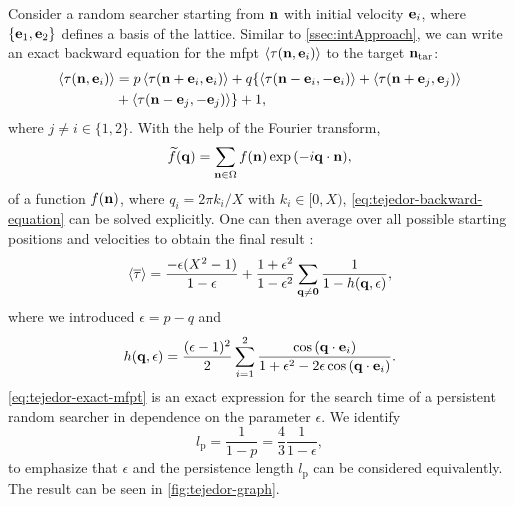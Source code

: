 Consider a random searcher starting from $\bv{n}$ with initial velocity $\bv{e}_i$, where $\{\bv{e}_1, \bv{e}_2\}$ defines a basis of the lattice. Similar to \autoref{ssec:intApproach}, we can write an exact backward equation for the \ac{mfpt} $\mfpt[\tau(\bv{n},\bv{e}_i)]$ to the target $\bv{n}_\textrm{tar}$:
\begin{equation}\label{eq:tejedor-backward-equation}
 \begin{aligned}
  \mfpt[\tau(\bv{n},\bv{e}_i)] &= p \mfpt[\tau(\bv{n} + \bv{e}_i,\bv{e}_i)] + q \{ \mfpt[\tau(\bv{n} - \bv{e}_i,-\bv{e}_i)] + \mfpt[\tau(\bv{n} + \bv{e}_j,\bv{e}_j)] 
  \\
  &+ \mfpt[\tau(\bv{n} - \bv{e}_j,-\bv{e}_j)] \} + 1,
 \end{aligned}
\end{equation}
where $j \neq i \in \{1,2\}$. With the help of the Fourier transform,
\begin{equation*}
 \fourier{f}(\bv{q}) = \sum\limits_{\bv{n} \in \Omega} f(\bv{n}) \exp{(-i \bv{q} \cdot \bv{n})},
\end{equation*}
of a function $f(\bv{n})$, where $q_i = 2\pi k_i / X$ with $k_i \in [0, X)$, \autoref{eq:tejedor-backward-equation} can be solved explicitly. One can then average over all possible starting positions and velocities to obtain the final result \cite{tejedor:2012}:
\begin{equation}\label{eq:tejedor-exact-mfpt}
 \mfpt[\mean{\tau}] = \frac{-\epsilon(X^2 - 1)}{1 - \epsilon} + \frac{1+\epsilon^2}{1-\epsilon^2} \sum\limits_{\bv{q} \neq \bv{0}} \frac{1}{1 - h(\bv{q}, \epsilon)},
\end{equation}
where we introduced $\epsilon = p-q$ and
\begin{equation*}
 h(\bv{q},\epsilon) = \frac{(\epsilon -1)^2}{2} \sum\limits_{i=1}^2\frac{\cos{(\bv{q}\cdot\bv{e}_i)}}{1+ \epsilon^2 - 2\epsilon\cos{(\bv{q}\cdot\bv{e}_i)}}.
\end{equation*}
\autoref{eq:tejedor-exact-mfpt} is an exact expression for the search time of a persistent random searcher in dependence on the parameter $\epsilon$. We identify
\begin{equation*}
 l_\textrm{p} = \frac{1}{1-p} = \frac{4}{3} \frac{1}{1-\epsilon},
\end{equation*}
to emphasize that $\epsilon$ and the persistence length $l_\textrm{p}$ can be considered equivalently. The result can be seen in \autoref{fig:tejedor-graph}.

